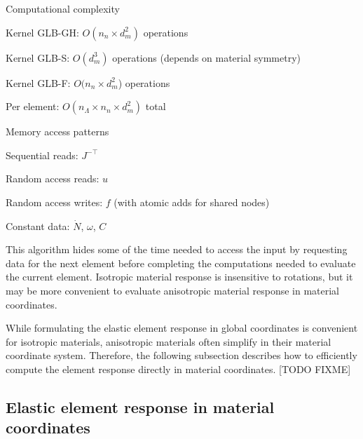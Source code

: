 \documentclass[]             %
{NASA}                       %
\begin{document}
Computational complexity

Kernel GLB-GH: $O(n_n \times d_m^2)$ operations %

Kernel GLB-S: $O(d_m^3)$ operations (depends on material symmetry)%

Kernel GLB-F: $O(n_n \times d_m^2$) operations %

Per element: $O(n_\Lambda \times n_n \times d_m^2)$ total %

Memory access patterns

Sequential reads: $J^{-\top}$

Random access reads: $u$

Random access writes: $f$ (with atomic adds for shared nodes)

Constant data: $\dot{N}$, $\omega$, $C$


This algorithm hides some of the time needed to access the input by requesting
 data for the next element before completing the computations needed to
 evaluate the current element.
 Isotropic material response is insensitive to rotations, but it may be
 more convenient to evaluate anisotropic material response in material coordinates.

While formulating the elastic element response in global coordinates is convenient for isotropic materials, anisotropic materials often simplify in their material coordinate system. Therefore, the following subsection describes how to efficiently compute the element response directly in material coordinates. [TODO FIXME]

\subsection{Elastic element response in material coordinates}
\label{subsec:EBE-tensor-train-aniso}
\end{document}
